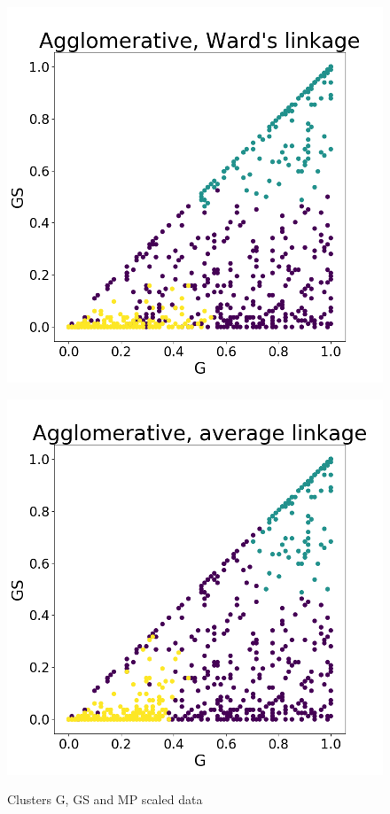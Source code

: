 \documentclass[a4paper]{article}
\begin{document}
\begin{figure}
\begin{minipage}{.22\textwidth}
  \label{fig:complete_g_gs_mp_scaled}
\end{minipage}
\begin{minipage}{.22\textwidth}
  \centering
  \includegraphics[scale=0.14]{ward_link_g_gs_mp_scaled.png}
  \label{fig:ward_g_gs_mp_scaled}
\end{minipage}
\begin{minipage}{.22\textwidth}
  \centering
  \includegraphics[scale=0.14]{average_link_g_gs_mp_scaled.png}
  \label{fig:average_g_gs_mp_scaled}
\end{minipage}
\caption{Clusters G, GS and MP scaled data}
\label{plt:clust_g_gs_mp_k3_scaled}
\end{figure}
\end{document}

